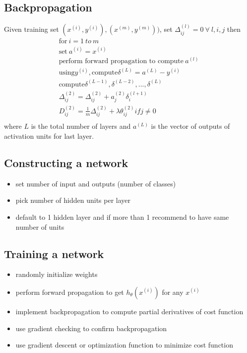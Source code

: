 \documentclass[12pt]{article}
\begin{document}
\subsection{Backpropagation}
Given training set ${(x^{(i)}, y^{(i)}), (x^{(m)}, y^{(m)})})$, set $\Delta_{ij}^{(l)}=0\:\forall\: l,i,j$ then 
\begin{align*}
	\text{for} \:i=1 \:to\: m \\
	\text{set} \:a^{(i)} = x^{(i)} \\
	\text{perform forward propagation to compute}\: a^{(l)} \\
	\text{using} y^{(i)}, \text{compute} \delta^{(L)}=a^{(L)}-y^{(i)} \\
	\text{compute} \delta^{(L-1)}, \delta^{(L-2)},...,\delta^{(L)} \\
	\Delta_{ij}^{(2)} = \Delta_{ij}^{(2)} + a_j^{(2)}\delta_i^{(l+1)} \\
	D_{ij}^{(2)}=\frac{1}{m}\Delta_{ij}^{(2)} + \lambda\theta_{ij}^{(2)} if j\ne0 \\
\end{align*}
where $L$ is the total number of layers and $a^{(L)}$ is the vector of outputs of activation units for last layer.

\subsection{Constructing a network}
\begin{itemize}
	\item set number of input and outputs (number of classes)
	\item pick number of hidden units per layer
	\item default to 1 hidden layer and if more than 1 recommend to have same number of units
\end{itemize}

\subsection{Training a network}
\begin{itemize}
	\item randomly initialize weights
	\item perform forward propagation to get $h_\theta(x^{(i)})$ for any $x^{(i)}$
	\item implement backpropagation to compute partial derivatives of cost function
	\item use gradient checking to confirm backpropagation
	\item use gradient descent or optimization function to minimize cost function
\end{itemize}
\end{document}
